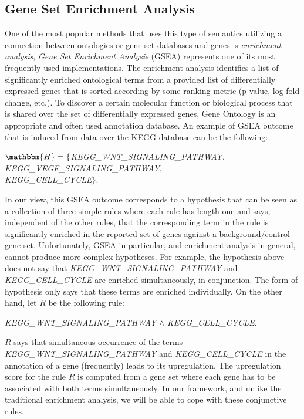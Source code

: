 \documentclass{bmcart}
\begin{document}
\subsection*{Gene Set Enrichment Analysis}
One of the most popular methods that uses this type of semantics utilizing a connection between ontologies or gene set databases and genes is \emph{enrichment analysis}, \emph{Gene Set Enrichment Analysis} (GSEA) \cite{subramanian2005gene} represents one of its most frequently used implementations. The enrichment analysis identifies a list of significantly enriched ontological terms from a provided list of differentially expressed genes that is sorted according by some ranking metric (p-value, log fold change, etc.). To discover a certain molecular function or biological process that is shared over the set of differentially expressed genes, Gene Ontology \cite{ashburner2000gene,gene2016expansion} is an appropriate and often used annotation database.
An example of GSEA outcome that is induced from data over the KEGG database can be the following: 

\begin{center}
    $\mathbbm{H}= \{$\emph{KEGG\_WNT\_SIGNALING\_PATHWAY},\\ \emph{KEGG\_VEGF\_SIGNALING\_PATHWAY},\\ \emph{KEGG\_CELL\_CYCLE}$\}$.
\end{center}

In our view, this GSEA outcome corresponds to a hypothesis that can be seen as a collection of three simple rules where each rule has length one and says, independent of the other rules, that the corresponding term in the rule is significantly enriched in the reported set of genes against a background/control gene set. Unfortunately, GSEA in particular, and enrichment analysis in general, cannot produce more complex hypotheses. For example, the hypothesis above does not say that \emph{KEGG\_WNT\_SIGNALING\_PATHWAY} and \emph{KEGG\_CELL\_CYCLE} are enriched simultaneously, in conjunction. The form of hypothesis only says that these terms are enriched individually.
On the other hand, let $R$ be the following rule:
\begin{center}
\emph{KEGG\_WNT\_SIGNALING\_PATHWAY} $\wedge$ \emph{KEGG\_CELL\_CYCLE}.    
\end{center}
$R$ says that simultaneous occurrence of the terms  \emph{KEGG\_WNT\_SIGNALING\_PATHWAY} and \emph{KEGG\_CELL\_CYCLE} in the annotation of a gene (frequently) leads to its upregulation. The upregulation score for the rule $R$ is computed from a gene set where each gene has to be associated with both terms simultaneously. In our framework, and unlike the traditional enrichment analysis, we will be able to cope with these conjunctive rules.
\end{document}
